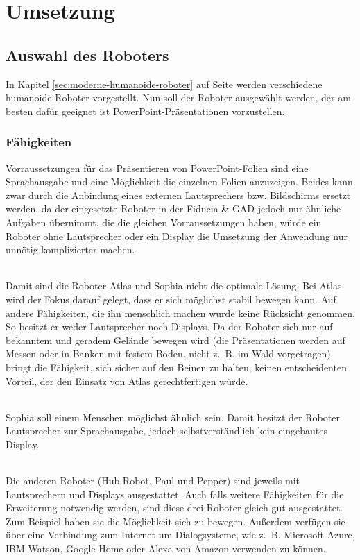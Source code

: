 \chapter{Umsetzung}\label{sec:umsetzung}
\section{Auswahl des Roboters}
In Kapitel \ref{sec:moderne-humanoide-roboter} auf Seite
\pageref{sec:moderne-humanoide-roboter} werden verschiedene humanoide Roboter
vorgestellt. Nun soll der Roboter ausgewählt werden, der am besten dafür
geeignet ist PowerPoint-Präsentationen vorzustellen.

\subsection{Fähigkeiten}
Vorraussetzungen für das Präsentieren von PowerPoint-Folien sind eine
Sprachausgabe und eine Möglichkeit die einzelnen Folien anzuzeigen. Beides kann
zwar durch die Anbindung eines externen Lautsprechers bzw. Bildschirms ersetzt
werden, da der eingesetzte Roboter in der Fiducia \& GAD jedoch nur ähnliche
Aufgaben übernimmt, die die gleichen Vorraussetzungen haben, würde ein Roboter
ohne Lautsprecher oder ein Display die Umsetzung der Anwendung nur unnötig
komplizierter machen.

\subparagraph{}
Damit sind die Roboter Atlas und Sophia nicht die optimale Lösung. Bei Atlas
wird der Fokus darauf gelegt, dass er sich möglichst stabil bewegen kann. Auf
andere Fähigkeiten, die ihn menschlich machen wurde keine Rücksicht genommen. So
besitzt er weder Lautsprecher noch Displays. Da der Roboter sich nur auf
bekanntem und geradem Gelände bewegen wird (die Präsentationen werden auf
Messen oder in Banken mit festem Boden, nicht z.~B. im Wald vorgetragen) bringt
die Fähigkeit, sich sicher auf den Beinen zu halten, keinen entscheidenten
Vorteil, der den Einsatz von Atlas gerechtfertigen würde.

\subparagraph{}
Sophia soll einem Menschen möglichst ähnlich sein. Damit besitzt der Roboter
Lautsprecher zur Sprachausgabe, jedoch selbstverständlich kein eingebautes
Display.

\subparagraph{}
Die anderen Roboter (Hub-Robot, Paul und Pepper) sind jeweils mit Lautsprechern
und Displays ausgestattet. Auch falls weitere Fähigkeiten für die Erweiterung
notwendig werden, sind diese drei Roboter gleich gut ausgestattet. Zum Beispiel
haben sie die Möglichkeit sich zu bewegen. Außerdem verfügen sie über eine
Verbindung zum Internet um Dialogsysteme, wie z.~B. Microsoft Azure, IBM Watson,
Google Home oder Alexa von Amazon verwenden zu können.


